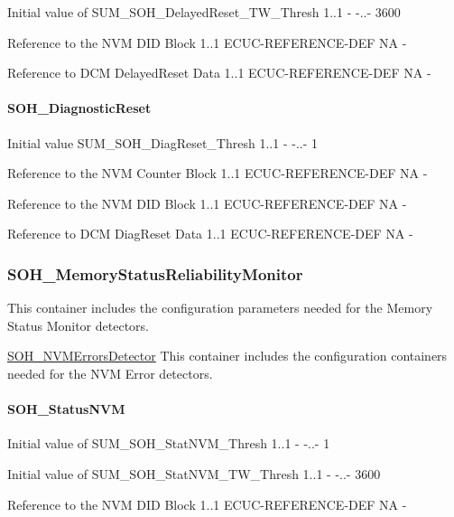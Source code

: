 {{{{{{{{{{{{{{
{Initial value of SUM_SOH_DelayedReset_TW_Thresh}
{1..1}
{-}
{-..-}
{3600}}

{
{Reference to the NVM DID Block}
{1..1}
{ECUC-REFERENCE-DEF}
{NA}
{-}}

{
{Reference to DCM DelayedReset Data}
{1..1}
{ECUC-REFERENCE-DEF}
{NA}
{-}}


\paragraph{SOH\_DiagnosticReset}

{
{Initial value SUM_SOH_DiagReset_Thresh}
{1..1}
{-}
{-..-}
{1}}

{
{Reference to the NVM Counter Block}
{1..1}
{ECUC-REFERENCE-DEF}
{NA}
{-}}

{
{Reference to the NVM DID Block}
{1..1}
{ECUC-REFERENCE-DEF}
{NA}
{-}}

{
{Reference to DCM DiagReset Data}
{1..1}
{ECUC-REFERENCE-DEF}
{NA}
{-}}

\subsubsection{SOH\_MemoryStatusReliabilityMonitor}
This container includes the configuration parameters needed for the Memory Status Monitor detectors.

\underline{SOH\_NVMErrorsDetector}\newline
This container includes the configuration containers needed for the NVM Error detectors.

\paragraph{SOH\_StatusNVM}

{
{Initial value of SUM_SOH_StatNVM_Thresh}
{1..1}
{-}
{-..-}
{1}}

{
{Initial value of SUM_SOH_StatNVM_TW_Thresh}
{1..1}
{-}
{-..-}
{3600}}

{
{Reference to the NVM DID Block}
{1..1}
{ECUC-REFERENCE-DEF}
{NA}
{-}}

}}}}}}}}}}}}}
